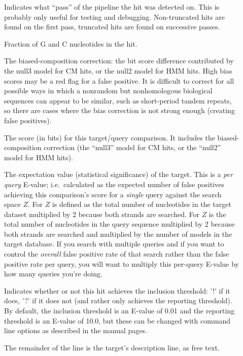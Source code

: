 \begin{description}
\item[] 
  Indicates what ``pass'' of the pipeline the hit was detected
  on. This is probably only useful for testing and
  debugging. Non-truncated hits are found on the first pass, truncated
  hits are found on successive passes.

\item[] 
  Fraction of G and C nucleotides in the hit. 

\item[] The biased-composition correction: the bit
  score difference contributed by the null3 model for CM hits, or the
  null2 model for HMM hits. High bias scores may be a red flag for a
  false positive. It is difficult to correct for all possible ways in
  which a nonrandom but nonhomologous biological sequences can appear
  to be similar, such as short-period tandem repeats, so there are
  cases where the bias correction is not strong enough (creating false
  positives).

\item[]
  The score (in bits) for this target/query comparison. It includes
  the biased-composition correction (the ``null3'' model for CM hits,
  or the ``null2'' model for HMM hits). 

\item[] The expectation value (statistical
  significance) of the target.  This is a \emph{per query} E-value;
  i.e.\ calculated as the expected number of false positives achieving
  this comparison's score for a \emph{single} query against the search
  space $Z$. For  $Z$ is defined as the total number of
  nucleotides in the target dataset multiplied by 2 because both strands
  are searched. For  $Z$ is the total number of
  nucleotides in the query sequence multiplied by 2 because both
  strands are searched and multiplied by the number of models in the target
  database. If you search with multiple queries and if you want to
  control the \emph{overall} false positive rate of that search rather
  than the false positive rate per query, you will want to multiply
  this per-query E-value by how many queries you're doing.

\item[] 
  Indicates whether or not this hit achieves the inclusion threshold:
  '!' if it does, '?' if it does not (and rather only achieves the
  reporting threshold). By default, the inclusion threshold is an
  E-value of 0.01 and the reporting threshold is an E-value of 10.0,
  but these can be changed with command line options as described in
  the manual pages.

\item[] 
  The remainder of the line is the target's description line, as free text.
\end{description}

